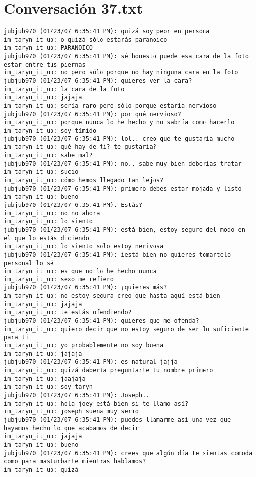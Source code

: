 \section{Conversaci\'on 37.txt}

\begin{verbatim}
jubjub970 (01/23/07 6:35:41 PM): quizá soy peor en persona
im_taryn_it_up: o quizá sólo estarás paranoico
im_taryn_it_up: PARANOICO
jubjub970 (01/23/07 6:35:41 PM): sé honesto puede esa cara de la foto estar entre tus piernas
im_taryn_it_up: no pero sólo porque no hay ninguna cara en la foto
jubjub970 (01/23/07 6:35:41 PM): quieres ver la cara?
im_taryn_it_up: la cara de la foto
im_taryn_it_up: jajaja
im_taryn_it_up: sería raro pero sólo porque estaría nervioso
jubjub970 (01/23/07 6:35:41 PM): por qué nervioso?
im_taryn_it_up: porque nunca lo he hecho y no sabría como hacerlo
im_taryn_it_up: soy tímido
jubjub970 (01/23/07 6:35:41 PM): lol.. creo que te gustaría mucho
im_taryn_it_up: qué hay de ti? te gustaría?
im_taryn_it_up: sabe mal?
jubjub970 (01/23/07 6:35:41 PM): no.. sabe muy bien deberías tratar
im_taryn_it_up: sucio
im_taryn_it_up: cómo hemos llegado tan lejos?
jubjub970 (01/23/07 6:35:41 PM): primero debes estar mojada y listo
im_taryn_it_up: bueno
jubjub970 (01/23/07 6:35:41 PM): Estás?
im_taryn_it_up: no no ahora
im_taryn_it_up: lo siento
jubjub970 (01/23/07 6:35:41 PM): está bien, estoy seguro del modo en el que lo estás diciendo
im_taryn_it_up: lo siento sólo estoy nerivosa
jubjub970 (01/23/07 6:35:41 PM): iestá bien no quieres tomartelo personal lo sé
im_taryn_it_up: es que no lo he hecho nunca
im_taryn_it_up: sexo me refiero
jubjub970 (01/23/07 6:35:41 PM): ¡quieres más?
im_taryn_it_up: no estoy segura creo que hasta aquí está bien
im_taryn_it_up: jajaja
im_taryn_it_up: te estás ofendiendo?
jubjub970 (01/23/07 6:35:41 PM): quieres que me ofenda?
im_taryn_it_up: quiero decir que no estoy seguro de ser lo suficiente para ti
im_taryn_it_up: yo probablemente no soy buena
im_taryn_it_up: jajaja
jubjub970 (01/23/07 6:35:41 PM): es natural jajja
im_taryn_it_up: quizá dabería preguntarte tu nombre primero
im_taryn_it_up: jaajaja
im_taryn_it_up: soy taryn
jubjub970 (01/23/07 6:35:41 PM): Joseph.. 
im_taryn_it_up: hola joey está bien si te llamo así?
im_taryn_it_up: joseph suena muy serio
jubjub970 (01/23/07 6:35:41 PM): puedes llamarme así una vez que hayamos hecho lo que acabamos de decir
im_taryn_it_up: jajaja
im_taryn_it_up: bueno
jubjub970 (01/23/07 6:35:41 PM): crees que algún día te sientas comoda como para masturbarte mientras hablamos?
im_taryn_it_up: quizá

\end{verbatim}

